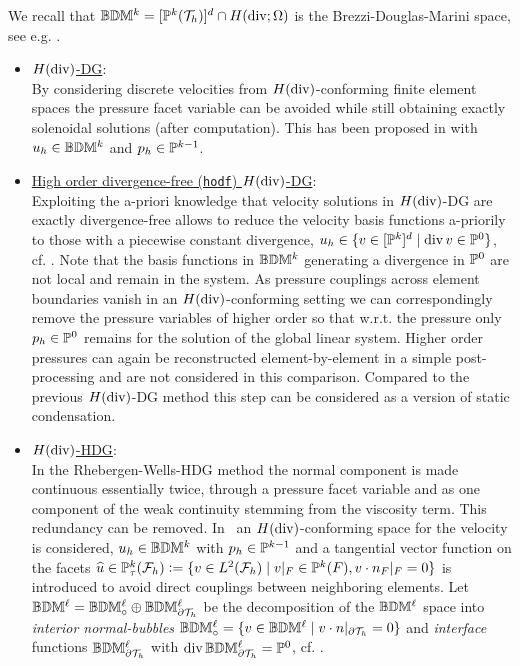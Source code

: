 \documentclass[pdflatex,sn-mathphys,Numbered]{sn-jnl}%
\renewcommand{\hat}[1]{\widehat{#1}}
\theoremstyle{remark}%
\theoremstyle{definition}%
\begin{document}
We recall that $\mathbb{B}\mathbb{D}\mathbb{M}^{k}= [\mathbb{P}^k({\mathcal{T}_h})]^d \cap H(\operatorname{\mathrm{div}};\Omega)$ is the Brezzi-Douglas-Marini space, see e.g. \cite{brezzi}.
\begin{itemize}
  \item \underline{$H(\operatorname{\mathrm{div}})$-DG}: \\[0.4ex] By considering discrete velocities from $H(\operatorname{\mathrm{div}})$-conforming finite element spaces the pressure facet variable can be avoided while still obtaining exactly solenoidal solutions (after computation). This has been proposed in \cite{cockburn2007note} with $u_h \in \mathbb{B}\mathbb{D}\mathbb{M}^k$ and $p_h \in \mathbb{P}^{k-1}$. %
  \item \underline{High order divergence-free (\texttt{hodf}) $H(\operatorname{\mathrm{div}})$-DG}: \\[0.4ex] Exploiting the a-priori knowledge that velocity solutions in $H(\operatorname{\mathrm{div}})$-DG are exactly divergence-free allows to reduce the velocity basis functions a-priorily to those with a piecewise constant divergence, $u_h \in \{v \in [\mathbb{P}^k]^d \mid \operatorname{\mathrm{div}} v \in \mathbb{P}^0 \}$, cf. \cite{zaglmayr2006high}. Note that the basis functions in $\mathbb{B}\mathbb{D}\mathbb{M}^k$ generating a divergence in $\mathbb{P}^0$ are not local and remain in the system. As pressure couplings across element boundaries vanish in an $H(\operatorname{\mathrm{div}})$-conforming setting we can correspondingly remove the pressure variables of higher order so that w.r.t. the pressure only $p_h \in \mathbb{P}^0$ remains for the solution of the global linear system. Higher order pressures can again be reconstructed element-by-element in a simple post-processing and are not considered in this comparison. Compared to the previous $H(\operatorname{\mathrm{div}})$-DG method this step can be considered as a version of static condensation. 
  \item \underline{$H(\operatorname{\mathrm{div}})$-HDG}: \\[0.4ex] In the Rhebergen-Wells-HDG method the normal component is made continuous essentially twice, through a pressure facet variable and as one component of the weak continuity stemming from the viscosity term. This redundancy can be removed. In~\cite{LS_CMAME_2016} an $H(\operatorname{\mathrm{div}})$-conforming space for the velocity is considered, $u_h \in \mathbb{B}\mathbb{D}\mathbb{M}^k$ with $p_h \in \mathbb{P}^{k-1}$ and a tangential vector function on the facets $\hat{u} \in \PP_\tau^k(\Fh) := \{ v \in L^2(\Fh)  \mid v|_F \in \PP^k(F), v \cdot n_F |_F = 0 \}$ is introduced to avoid direct couplings between neighboring elements.
  Let $\mathbb{B}\mathbb{D}\mathbb{M}^\ell = \mathbb{B}\mathbb{D}\mathbb{M}_{\circ}^\ell \oplus \mathbb{B}\mathbb{D}\mathbb{M}_{\partial {\mathcal{T}_h}}^\ell$ be the decomposition of the $\mathbb{B}\mathbb{D}\mathbb{M}^\ell$ space into \emph{interior normal-bubbles} $\mathbb{B}\mathbb{D}\mathbb{M}_{\circ}^\ell = \{v \in \mathbb{B}\mathbb{D}\mathbb{M}^\ell \mid v \cdot n|_{\partial {\mathcal{T}_h}} = 0\}$ and \emph{interface} functions $\mathbb{B}\mathbb{D}\mathbb{M}_{\partial {\mathcal{T}_h}}^\ell$ with $\operatorname{\mathrm{div}} \mathbb{B}\mathbb{D}\mathbb{M}_{\partial {\mathcal{T}_h}}^\ell = \mathbb{P}^0$, cf. \cite{zaglmayr2006high}.

\end{itemize}
\end{document}
